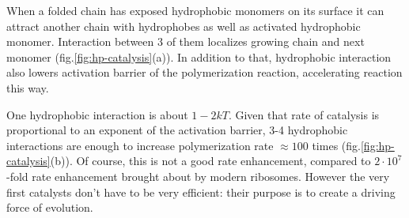 \documentclass[journal=jacsat,manuscript=article,layout=twocolumn]{achemso}
\begin{document}
When a folded chain has exposed hydrophobic monomers on its surface it can attract another chain 
with hydrophobes as well as activated hydrophobic monomer. Interaction between 3 of them localizes 
growing chain and next monomer (fig.\ref{fig:hp-catalysis}(a)). In addition to that, hydrophobic 
interaction also lowers activation barrier of the polymerization reaction, accelerating reaction 
this way.

One hydrophobic interaction is about $1-2kT$. Given that rate of catalysis is proportional to an 
exponent of the activation barrier, 3-4 hydrophobic interactions are enough to increase 
polymerization rate $\approx 100$ times (fig.\ref{fig:hp-catalysis}(b)). 
Of course, this is not a good rate enhancement, compared to $2\cdot10^7$-fold rate enhancement 
brought about
by modern ribosomes\cite{Sievers2004a}. However the very 
first catalysts don't have to be very efficient: their purpose is to create a driving force of 
evolution.
\end{document}

